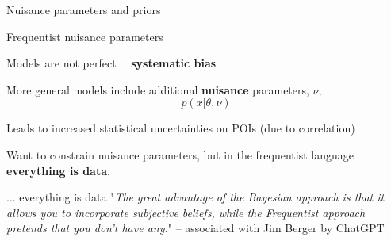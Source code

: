 \documentclass[
aspectratio=169,
14pt,
professionalfonts
]{beamer}
\newcommand{\arrow}{~\ding{220}~}
\begin{document}
\begin{frame}
\center
\Large
Nuisance parameters and priors
\end{frame}

\begin{frame}{Frequentist nuisance parameters}

Models are not perfect \arrow \textbf{systematic bias} 

More general models include additional \textbf{nuisance} parameters, $\nu$,
$$p(x|\theta, \nu)$$

Leads to increased statistical uncertainties on POIs (due to correlation)

Want to constrain nuisance parameters, but in the frequentist language \textbf{everything is data}.








\end{frame}

\begin{frame}{... everything is data}    
    "\textit{The great advantage of the Bayesian approach is that it allows you to incorporate subjective beliefs, while the Frequentist approach pretends that you don't have any.}" 
    \flushright -- associated with Jim Berger by ChatGPT
\end{frame}
\end{document}
